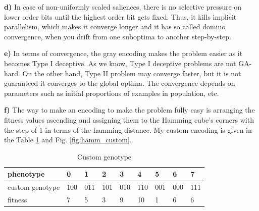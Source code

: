 \documentclass[12pt, a4paper]{article}
\begin{document}
        {\bf d)} In case of non-uniformly scaled saliences, there is no selective pressure
        on lower order bits until the highest order bit gets fixed. Thus, it kills implicit
        parallelism, which makes it converge longer and it has so called domino convergence,
        when you drift from one suboptima to another step-by-step.

        {\bf e)} In terms of convergence, the gray encoding makes the problem easier as it
        becomes Type I deceptive. As we know, Type I deceptive problems are not GA-hard.
        On the other hand, Type II problem may converge faster, but it is not guaranteed
        it converges to the global optima. The convergence depends on parameters such as
        initial proportions of examples in population, etc.

        {\bf f)} The way to make an encoding to make the problem fully easy is arranging
        the fitness values ascending and assigning them to the Hamming cube's corners with the step
        of 1 in terms of the hamming distance. My custom encoding is given in the Table
        \ref{tab:cust_gt} and Fig. \ref{fig:hamm_custom}.

        \begin{table}[H]
        \centering
        \caption{Custom genotype}
        \label{tab:cust_gt}
            \begin{tabular}{|l|llllllll|}
            \hline
            phenotype       & 0   & 1   & 2   & 3   & 4   & 5   & 6   & 7   \\ \hline
            custom genotype & 100 & 011 & 101 & 010 & 110 & 001 & 000 & 111 \\ \hline
            fitness         & 7   & 5   & 3   & 9   & 10  & 1   & 6   & 6   \\ \hline
            \end{tabular}
        \end{table}
\end{document}
